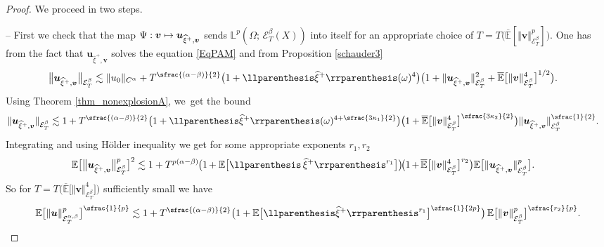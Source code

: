 \documentclass[JEP,XML,SOM,Unicode,published]{cedram}
\newcommand\mto{\mathchoice{\longmapsto}{\mapsto}{\mapsto}{\mapsto}}
\newcommand{\psfrac}[2]{\sfrac{(#1)}{#2}}
\theoremstyle{definition}
\newcommand\bbE{\mathbb{E}}
\newcommand{\mcE}{\mathcal{E}}
\newcommand{\bbL}{\mathbb{L}}
\newcommand{\bsu}{\boldsymbol{u}}
\newcommand{\bsv}{\boldsymbol{v}}
\newcommand{\dab}{\mcE^\beta_T}
\newcommand{\norme}[1]{\Vert #1 \Vert}
\begin{document}
\begin{proof}
We proceed in two steps.

-- First we check that the map $\Psi : \bsv\mto \bsu_{\widehat\xi^+,\bsv}$ sends $\bbL^p(\Omega;\,\mcE^\beta_T(X))$ into itself for an appropriate choice of $T=T\bigl(\overline{\bbE}[\Vert \bsv\Vert^p_{\mcE^\beta_{{T}}}]\bigr)$. One has from the fact that $\bsu_{\widehat\xi^+,\bsv}$ solves the equation \eqref{EqPAM} and from Proposition \ref{schauder3}
\begin{align*}
\big\Vert \bsu_{\widehat\xi^+,\bsv} \big\Vert_{\mcE^\beta_T} &\lesssim \norme{u_0}_{C^\alpha} + T^{\psfrac{\alpha-\beta}{2}} \bigl(1 + \llparenthesis\widehat\xi^+\rrparenthesis(\omega)^4 \bigr) \bigl(1+ \norme{\bsu_{\widehat\xi^+,\bsv}}^2_{\mcE^\beta_T} + \overline{\bbE}\bigl[ \norme{\bsv}^4_{\mcE^\beta_T}\bigr]^{1/2}\bigr).
\end{align*}
Using Theorem \ref{thm_nonexplosionA}, we~get the bound
\begin{align*}
\norme{\bsu_{\widehat\xi^+,\bsv}}_{\mcE^\beta_T}&\lesssim 1 + T^{\psfrac{\alpha-\beta}{2}} \bigl(1 + \llparenthesis\widehat\xi^+\rrparenthesis(\omega)^{4+\sfrac{3\kappa_1}{2}} \bigr) \bigl(1 + \overline{\bbE}\bigl[ \norme{\bsv}^4_{\mcE^\beta_T}\bigr]^{\sfrac{3\kappa_2}{2}} \bigr) \norme{\bsu_{\widehat\xi^+,\bsv}}^{\sfrac{1}{2}}_{\mcE^\beta_T}.
\end{align*}
Integrating and using Hölder inequality we get for some appropriate exponents $r_1,r_2$
\begin{align*}
\bbE\bigl[ &\big\Vert \bsu_{\widehat\xi^+,\bsv} \big\Vert_{\mcE_T^\beta}^p\bigr]^2 \lesssim 1 + T^{p(\alpha-\beta)} \hspace{-0.03cm} \bigl(1 \hspace{-0.03cm}+ \bbE\bigl[\llparenthesis\,\widehat\xi^+\rrparenthesis^{r_1}\bigr]\bigr) \hspace{-0.03cm} \hspace{-0.03cm} \bigl(1 \hspace{-0.03cm}+\hspace{-0.03cm} \overline{\bbE}\bigl[\norme{\bsv}^{4}_{\dab}\bigr]^{r_2}\bigr) \bbE\bigl[\norme{\bsu_{\widehat\xi^+,\bsv}}_{\mcE_T^{\beta}}^{p}\bigr].
\end{align*}
So for $T = T\bigl(\overline{\bbE}\bigl[\Vert\bsv\Vert_{\dab}^4\bigr]\bigr)$ sufficiently small we have
\[
\bbE\bigl[\norme\bsu_{\mcE_T^{\alpha,\beta}}^{p}\bigr]^{\sfrac{1}{p}} \lesssim 1 + T^{\psfrac{\alpha-\beta}{2}}\bigl(1 + \bbE\bigl[\llparenthesis\widehat\xi^+\rrparenthesis^{r_1}\bigr]^{\sfrac{1}{2p}} \bigr)\, \bbE\bigl[\norme{\bsv}_{\mcE_T^\beta}^{p}\bigr]^{\sfrac{r_2}{p}}.
\]
\end{proof}
\end{document}
